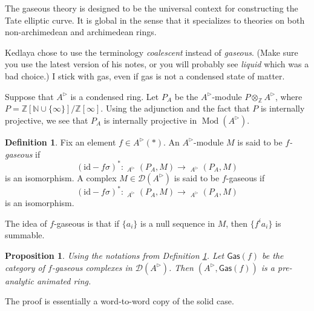 \documentclass{article}
\theoremstyle{plain}
\newtheorem{prop}[thm]{Proposition}
\theoremstyle{definition}
\newtheorem{defi}[thm]{Definition}
\theoremstyle{remark}
\DeclareMathOperator{\Homs}{\underline{Hom}}
\DeclareMathOperator{\rhoms}{\underline{RHom}}
\DeclareMathOperator{\modcat}{Mod}
\newcommand{\huflag}{\triangleright}
\newcommand{\D}{\mathcal{D}}
\begin{document}
The gaseous theory is designed to be the universal context for constructing the Tate elliptic curve.
It is global in the sense that it specializes to theories on both non-archimedean and archimedean rings.

Kedlaya chose to use the terminology \emph{coalescent} instead of \emph{gaseous}.
(Make sure you use the latest version of his notes, or you will probably see \emph{liquid} which was a bad choice.)
I stick with gas, even if gas is not a condensed state of matter.

Suppose that $ A ^{\huflag} $ is a condensed ring.
Let $ P _{A} $ be the $ A ^{\huflag} $-module $ P \otimes _{\mathbb{Z}} A ^{\huflag} $,
where $ P = \mathbb{Z}[\mathbb{N}\cup \{\infty\}] / \mathbb{Z}[\infty] $.
Using the adjunction and the fact that $ P $ is internally projective,
we see that $ P _{A} $ is internally projective in $ \modcat (A ^{\huflag}) $.

\begin{defi}
Fix an element $ f\in A ^{\huflag} (*) $. An $ A ^{\huflag} $-module $ M $ is said to be \emph{$ f $-gaseous} if
\begin{equation*}
(\mathrm{id} - f \sigma)^{*}: \Homs _{A ^{\huflag}}(P _{A}, M) \to \Homs _{A ^{\huflag}}(P _{A}, M)
\end{equation*}
is an isomorphism.
A complex $ M\in \D (A ^{\huflag}) $ is said to be $ f $-gaseous if
\begin{equation}
(\mathrm{id}-f \sigma)^{*}: \rhoms _{A ^{\huflag}}(P _{A}, M)\to \rhoms _{A ^{\huflag}}(P _{A}, M)
\end{equation}
is an isomorphism.
\label{gaseous::def}
\end{defi}

The idea of $ f $-gaseous is that
if $ \{a _{i}\} $ is a null sequence in $ M $, then
$ \{f ^{i} a _{i}\} $ is summable.

\begin{prop}
Using the notations from Definition \ref{gaseous::def}.
Let $ \mathsf{Gas}(f) $ be the category of $ f $-gaseous complexes in $ \D (A ^{\huflag}) $.
Then $ (A ^{\huflag}, \mathsf{Gas}(f)) $ is a pre-analytic animated ring.
\end{prop}

The proof is essentially a word-to-word copy of the solid case.
\end{document}

